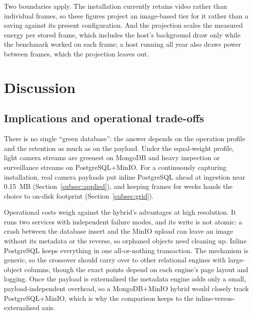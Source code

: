 \documentclass[pdflatex,sn-basic]{sn-jnl}%
\begin{document}
Two boundaries apply. The installation currently retains video rather than individual frames, so these figures project an image-based tier for it rather than a saving against its present configuration. And the projection scales the measured energy per stored frame, which includes the host's background draw only while the benchmark worked on each frame; a host running all year also draws power between frames, which the projection leaves out.

\section{Discussion}\label{sec:discussion}

\subsection{Implications and operational trade-offs}
There is no single ``green database'': the answer depends on the operation profile and the retention as much as on the payload. Under the equal-weight profile, light camera streams are greenest on MongoDB and heavy inspection or surveillance streams on PostgreSQL+MinIO. For a continuously capturing installation, real camera payloads put inline PostgreSQL ahead at ingestion near 0.15~MB (Section~\ref{subsec:applied}), and keeping frames for weeks hands the choice to on-disk footprint (Section~\ref{subsec:grid}).

Operational costs weigh against the hybrid's advantages at high resolution. It runs two services with independent failure modes, and its write is not atomic: a crash between the database insert and the MinIO upload can leave an image without its metadata or the reverse, so orphaned objects need cleaning up. Inline PostgreSQL keeps everything in one all-or-nothing transaction. The mechanism is generic, so the crossover should carry over to other relational engines with large-object columns, though the exact points depend on each engine's page layout and logging. Once the payload is externalised the metadata engine adds only a small, payload-independent overhead, so a MongoDB+MinIO hybrid would closely track PostgreSQL+MinIO, which is why the comparison keeps to the inline-versus-externalised axis.
\end{document}
